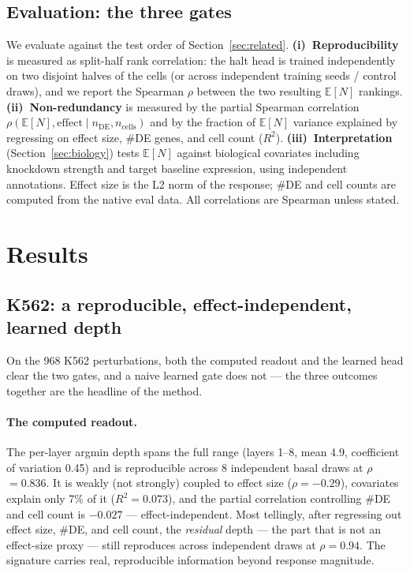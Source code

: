 \documentclass[11pt]{article}
\newcommand{\EN}{\ensuremath{\mathbb{E}[N]}}
\let\mathrho\rho
\renewcommand{\rho}{\ensuremath{\mathrho}}
\begin{document}
\subsection{Evaluation: the three gates}
\label{sec:eval}

We evaluate against the test order of Section~\ref{sec:related}.
\textbf{(i)~Reproducibility} is measured as split-half rank correlation: the halt head is trained
independently on two disjoint halves of the cells (or across independent training seeds / control
draws), and we report the Spearman \rho{} between the two resulting \EN{} rankings.
\textbf{(ii)~Non-redundancy} is measured by the partial Spearman correlation
$\rho(\EN{},\text{effect}\mid n_{\text{DE}}, n_{\text{cells}})$ and by the fraction of \EN{}
variance explained by regressing on effect size, \#DE genes, and cell count ($R^2$).
\textbf{(iii)~Interpretation} (Section~\ref{sec:biology}) tests \EN{} against biological
covariates including knockdown strength and target baseline expression, using independent
annotations. Effect size is the L2 norm of the response; \#DE and cell counts are computed from
the native eval data. All correlations are Spearman unless stated.

\section{Results}

\subsection{K562: a reproducible, effect-independent, learned depth}
\label{sec:k562}

On the 968 K562 perturbations, both the computed readout and the learned head clear the two gates,
and a naive learned gate does not --- the three outcomes together are the headline of the method.

\paragraph{The computed readout.} The per-layer argmin depth spans the full range (layers 1--8,
mean 4.9, coefficient of variation 0.45) and is reproducible across 8 independent basal draws at
\rho{}$=0.836$. It is weakly (not strongly) coupled to effect size (\rho{}$=-0.29$), covariates
explain only 7\% of it ($R^2=0.073$), and the partial correlation controlling \#DE and cell count
is $-0.027$ --- effect-independent. Most tellingly, after regressing out effect size, \#DE, and
cell count, the \emph{residual} depth --- the part that is not an effect-size proxy --- still
reproduces across independent draws at \rho{}$=0.94$. The signature carries real, reproducible
information beyond response magnitude.
\end{document}

